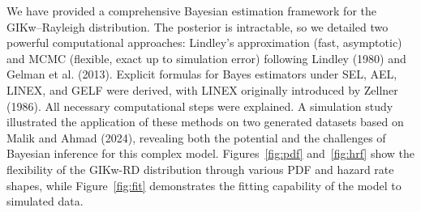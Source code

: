 \documentclass[12pt]{article}
\begin{document}
We have provided a comprehensive Bayesian estimation framework for the
GIKw–Rayleigh distribution. The posterior is intractable, so we detailed two
powerful computational approaches: Lindley's approximation (fast, asymptotic)
and MCMC (flexible, exact up to simulation error) following Lindley (1980) and
Gelman et al. (2013). Explicit formulas for Bayes estimators under SEL, AEL,
LINEX, and GELF were derived, with LINEX originally introduced by Zellner (1986).
All necessary computational steps were explained. A simulation study illustrated
the application of these methods on two generated datasets based on Malik and
Ahmad (2024), revealing both the potential and the challenges of Bayesian
inference for this complex model. Figures~\ref{fig:pdf} and~\ref{fig:hrf} show
the flexibility of the GIKw-RD distribution through various PDF and hazard rate
shapes, while Figure~\ref{fig:fit} demonstrates the fitting capability of the
model to simulated data.
\end{document}
